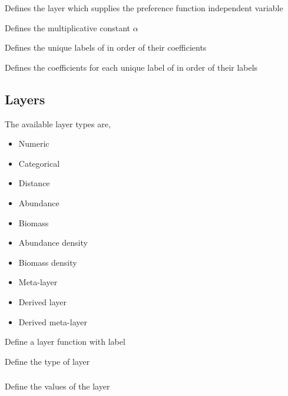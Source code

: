  {Defines the layer which supplies the preference function independent variable}

 {Defines the multiplicative constant $\alpha$}

 {Defines the unique labels of  in order of their coefficients}

 {Defines the coefficients for each unique label of  in order of their labels}

\subsection{Layers}

The available layer types  are,

\begin{itemize}
	\item Numeric
	\item Categorical
	\item Distance
	\item Abundance
	\item Biomass
	\item Abundance density
	\item Biomass density
	\item Meta-layer
	\item Derived layer
	\item Derived meta-layer
\end{itemize}

 {Define a layer function with label}

 {Define the type of layer}

\subsubsection[Numeric]{}

 {Define the values of the layer}

